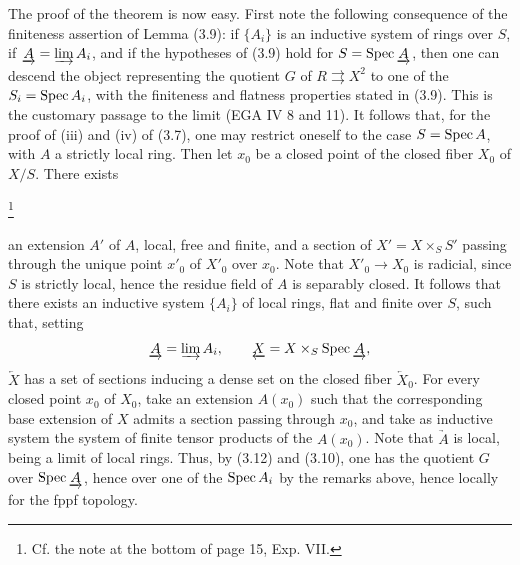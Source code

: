 The proof of the
theorem is now easy.
First note the
following consequence
of the finiteness
assertion of Lemma (3.9):
if \(\{A_i\}\) is an
inductive system of
rings over \(S\),
if \(\underrightarrow A=\varinjlim A_i\),
and if the hypotheses
of (3.9) hold for
\(S=\operatorname{Spec}\underrightarrow A\),
then one can descend
the object representing
the quotient \(G\)
of \(R\rightrightarrows X^2\)
to one of the
\(S_i=\operatorname{Spec} A_i\),
with the finiteness
and flatness properties
stated in (3.9).
This is the customary
passage to the limit
(EGA IV 8 and 11).
It follows that, for
the proof of (iii)
and (iv) of (3.7),
one may restrict
oneself to the case
\(S=\operatorname{Spec} A\), with
\(A\) a strictly
local ring.
Then let \(x_0\)
be a closed point
of the closed fiber
\(X_0\) of \(X/S\).
There exists
{\renewcommand{\thefootnote}{(*)}\addtocounter{footnote}{-1}%
\footnote{Cf. the note at the bottom
of page 15, Exp. VII.}}
an extension \(A'\)
of \(A\), local,
free and finite,
and a section of
\(X'=X\times_S S'\)
passing through the
unique point \(x'_0\)
of \(X'_0\) over \(x_0\).
Note that \(X'_0\to X_0\)
is radicial, since
\(S\) is strictly
local, hence the
residue field of
\(A\) is separably
closed.
It follows that
there exists an
inductive system
\(\{A_i\}\) of
local rings, flat
and finite over \(S\),
such that, setting
\[
\underrightarrow A=\varinjlim A_i,\qquad
\underleftarrow X=X\times_S\operatorname{Spec}\underrightarrow A,
\]
\(\underleftarrow X\)
has a set of
sections inducing a
dense set on the
closed fiber
\(\underleftarrow X_0\).
For every closed
point \(x_0\) of
\(X_0\), take an
extension \(A(x_0)\)
such that the
corresponding base
extension of \(X\)
admits a section
\og passing through \(x_0\)\fg,
and take as inductive
system the system
of finite tensor
products of the
\(A(x_0)\).
Note that
\(\underrightarrow A\)
is local, being a
limit of local rings.
Thus, by (3.12)
and (3.10), one
has the quotient
\(G\) over
\(\operatorname{Spec}\underrightarrow A\),
hence over one of
the \(\operatorname{Spec} A_i\)
by the remarks above,
hence locally for
the fppf topology.

